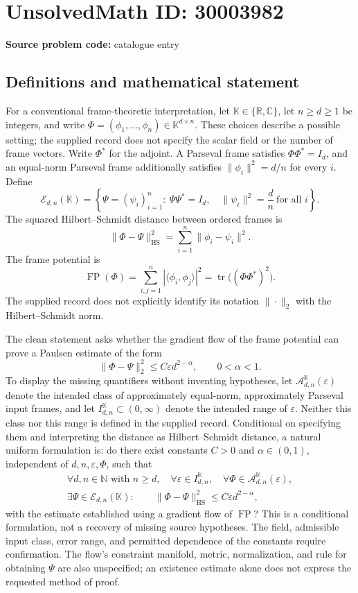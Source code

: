 \documentclass[11pt]{article}
\newcommand{\N}{\mathbb{N}}
\newcommand{\R}{\mathbb{R}}
\newcommand{\C}{\mathbb{C}}
\begin{document}
\section*{UnsolvedMath ID: 30003982}
\textbf{Source problem code:} catalogue entry
\subsection{Definitions and mathematical statement}
For a conventional frame-theoretic interpretation, let \(\mathbb K\in\{\R,\C\}\), let \(n\ge d\ge1\) be integers, and write \(\Phi=(\phi_1,\ldots,\phi_n)\in\mathbb K^{d\times n}\). These choices describe a possible setting; the supplied record does not specify the scalar field or the number of frame vectors. Write \(\Phi^*\) for the adjoint. A Parseval frame satisfies \(\Phi\Phi^*=I_d\), and an equal-norm Parseval frame additionally satisfies \(\|\phi_i\|^2=d/n\) for every \(i\). Define
\[
\mathcal E_{d,n}(\mathbb K)=\left\{\Psi=(\psi_i)_{i=1}^n:\ \Psi\Psi^*=I_d,\quad \|\psi_i\|^2=\frac dn\ \text{for all }i\right\}.
\]
The squared Hilbert--Schmidt distance between ordered frames is
\[
\|\Phi-\Psi\|_{\mathrm{HS}}^2=\sum_{i=1}^n\|\phi_i-\psi_i\|^2.
\]
The frame potential is
\[
\operatorname{FP}(\Phi)=\sum_{i,j=1}^n|\langle\phi_i,\phi_j\rangle|^2
=\operatorname{tr}\bigl((\Phi\Phi^*)^2\bigr).
\]
The supplied record does not explicitly identify its notation \(\|\cdot\|_2\) with the Hilbert--Schmidt norm.

The clean statement asks whether the gradient flow of the frame potential can prove a Paulsen estimate of the form
\[
\|\Phi-\Psi\|_2^2\le C\varepsilon d^{2-\alpha},\qquad 0<\alpha<1.
\]
To display the missing quantifiers without inventing hypotheses, let \(\mathcal A_{d,n}^{\mathbb K}(\varepsilon)\) denote the intended class of approximately equal-norm, approximately Parseval input frames, and let \(I_{d,n}^{\mathbb K}\subset(0,\infty)\) denote the intended range of \(\varepsilon\). Neither this class nor this range is defined in the supplied record. Conditional on specifying them and interpreting the distance as Hilbert--Schmidt distance, a natural uniform formulation is: do there exist constants \(C>0\) and \(\alpha\in(0,1)\), independent of \(d,n,\varepsilon,\Phi\), such that
\[
\begin{gathered}
\forall d,n\in\N\text{ with }n\ge d,\quad
\forall\varepsilon\in I_{d,n}^{\mathbb K},\quad
\forall\Phi\in\mathcal A_{d,n}^{\mathbb K}(\varepsilon),\\
\exists\Psi\in\mathcal E_{d,n}(\mathbb K):\qquad
\|\Phi-\Psi\|_{\mathrm{HS}}^2\le C\varepsilon d^{2-\alpha},
\end{gathered}
\]
with the estimate established using a gradient flow of \(\operatorname{FP}\)? This is a conditional formulation, not a recovery of missing source hypotheses. The field, admissible input class, error range, and permitted dependence of the constants require confirmation. The flow's constraint manifold, metric, normalization, and rule for obtaining \(\Psi\) are also unspecified; an existence estimate alone does not express the requested method of proof.
\end{document}
